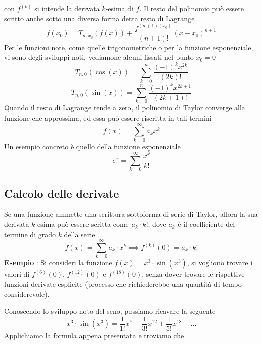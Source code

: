 \documentclass[10pt, letterpaper]{report}
\begin{document}
con $f^{(k)}$ si intende la derivata $k$-esima di $f$. Il resto del polinomio può essere scritto anche sotto 
una diversa forma detta resto di Lagrange
$$f(x_0)=T_{n,x_0}(f(x))+\dfrac{f^{(n+1)(x_0)}}{(n+1)!}(x-x_0)^{n+1}$$
Per le funzioni note, come quelle 
trigonometriche o per la funzione esponenziale, vi sono degli sviluppi noti, vediamone alcuni 
fissati nel punto $x_0=0$
$$
T_{n,0}(\cos(x))=\sum_{k=0}^n\dfrac{(-1)^kx^{2k}}{(2k)!}
$$$$
T_{n,0}(\sin(x))=\sum_{k=0}^n\dfrac{(-1)^kx^{2k+1}}{(2k+1)!}
$$
Quando il resto di Lagrange tende a zero, il polinomio di Taylor converge alla funzione che 
approssima, ed essa può essere riscritta in tali termini 
$$ f(x)=\sum_{k=0}^\infty a_kx^k$$ 
Un esempio concreto è quello della funzione esponenziale 
$$ e^x=\sum_{k=0}^\infty \dfrac{x^k}{k!}$$
\subsection{Calcolo delle derivate}
Se una funzione ammette una scrittura sottoforma di serie di Taylor, allora la sua 
derivata $k$-esima può essere scritta come $a_k\cdot k!$, dove $a_k$ è il coefficiente 
del termine di grado $k$ della serie 
$$ f(x)=\sum_{k=0}^\infty a_k\cdot x^k \implies f^{(k)}(0)=a_k\cdot k!$$
\textbf{Esempio} : Si consideri la funzione $f(x)=x^3\cdot \sin(x^3)$, si vogliono trovare i valori 
di $f^{(6)}(0)$, $f^{(12)}(0)$ e $f^{(18)}(0)$, senza dover trovare le rispettive funzioni 
derivate esplicite (processo che richiederebbe una quantità di tempo considerevole).
\begin{figure}[h!]
    \centering
\end{figure}\acc
Conoscendo lo sviluppo noto del seno, possiamo ricavare la seguente 
$$x^3\cdot \sin(x^3)=\dfrac{1}{1!}x^6-\dfrac{1}{3!}x^{12}+\dfrac{1}{5!}x^{18}-\dots$$
Applichiamo la formula appena presentata e troviamo che 
\end{document}
